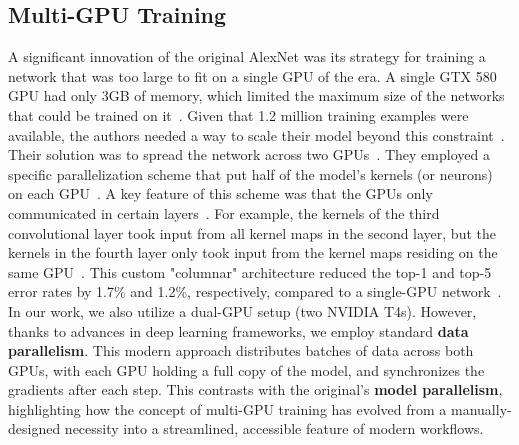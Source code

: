 \documentclass{article}
\begin{document}
\subsection{Multi-GPU Training}
\noindent
A significant innovation of the original AlexNet was its strategy for training a network that was too large to fit on a single GPU of the era. A single GTX 580 GPU had only 3GB of memory, which limited the maximum size of the networks that could be trained on it~\cite{krizhevsky2012imagenet}. Given that 1.2 million training examples were available, the authors needed a way to scale their model beyond this constraint~\cite{krizhevsky2012imagenet}.
Their solution was to spread the network across two GPUs~\cite{krizhevsky2012imagenet}. They employed a specific parallelization scheme that put half of the model's kernels (or neurons) on each GPU~\cite{krizhevsky2012imagenet}. A key feature of this scheme was that the GPUs only communicated in certain layers~\cite{krizhevsky2012imagenet}. For example, the kernels of the third convolutional layer took input from all kernel maps in the second layer, but the kernels in the fourth layer only took input from the kernel maps residing on the same GPU~\cite{krizhevsky2012imagenet}. This custom "columnar" architecture reduced the top-1 and top-5 error rates by 1.7\% and 1.2\%, respectively, compared to a single-GPU network~\cite{krizhevsky2012imagenet}.
In our work, we also utilize a dual-GPU setup (two NVIDIA T4s). However, thanks to advances in deep learning frameworks, we employ standard \textbf{data parallelism}. This modern approach distributes batches of data across both GPUs, with each GPU holding a full copy of the model, and synchronizes the gradients after each step. This contrasts with the original's \textbf{model parallelism}, highlighting how the concept of multi-GPU training has evolved from a manually-designed necessity into a streamlined, accessible feature of modern workflows.
\end{document}
